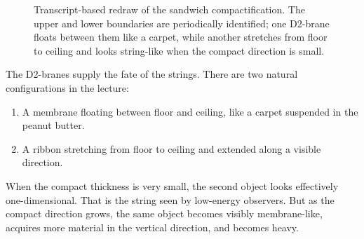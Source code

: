 \begin{figure}[h]
\centering
{}
\caption{Transcript-based redraw of the sandwich compactification. The upper and lower boundaries are periodically identified; one D2-brane floats between them like a carpet, while another stretches from floor to ceiling and looks string-like when the compact direction is small.}
\end{figure}

The D2-branes supply the fate of the strings. There are two natural configurations in the lecture:
\begin{enumerate}
\item A membrane floating between floor and ceiling, like a carpet suspended in the peanut butter.
\item A ribbon stretching from floor to ceiling and extended along a visible direction.
\end{enumerate}
When the compact thickness is very small, the second object looks effectively one-dimensional. That is the string seen by low-energy observers. But as the compact direction grows, the same object becomes visibly membrane-like, acquires more material in the vertical direction, and becomes heavy.

